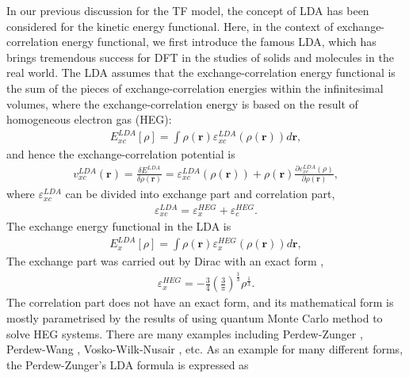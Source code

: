 In our previous discussion for the TF model, the concept of LDA has been considered for the kinetic energy functional. Here, in the context of exchange-correlation energy functional, we first introduce the famous LDA, which has brings tremendous success for DFT in the studies of solids and molecules in the real world. The LDA assumes that the exchange-correlation energy functional is the sum of the pieces of exchange-correlation energies within the infinitesimal volumes, where the exchange-correlation energy is based on the result of homogeneous electron gas (HEG): 
	\begin{equation}
	\begin{aligned}
        E_{xc}^{LDA}[\rho] = \int \rho(\textbf{r}) \varepsilon_{xc}^{LDA}(\rho(\textbf{r})) d\textbf{r},
    \end{aligned}
	\end{equation}
and hence the exchange-correlation potential is
	\begin{equation}
	\begin{aligned}
        v_{xc}^{LDA}(\textbf{r}) = \frac{\delta E^{LDA}}{\delta \rho(\textbf{r})} = \varepsilon_{xc}^{LDA}(\rho(\textbf{r})) + \rho(\textbf{r})\frac{\partial \varepsilon_{xc}^{LDA}(\rho)}{\partial \rho(\textbf{r})},
    \end{aligned}
	\end{equation}
where $\varepsilon_{xc}^{LDA}$ can be divided into exchange part and correlation part,
	\begin{equation}
	\begin{aligned}
        \varepsilon_{xc}^{LDA} = \varepsilon_{x}^{HEG} +\varepsilon_{c}^{HEG}.
    \end{aligned}
	\end{equation}
The exchange energy functional in the LDA is
	\begin{equation}
	\begin{aligned}
        E_{x}^{LDA}[\rho] = \int \rho(\textbf{r}) \varepsilon_{x}^{HEG}(\rho(\textbf{r})) d\textbf{r},
    \end{aligned}
	\end{equation}
The exchange part was carried out by Dirac with an exact form \cite{dirac1930note},
	\begin{equation}
	\begin{aligned}
        \varepsilon_{x}^{HEG} = -\frac{3}{4} \left( \frac{3}{\pi}\right)^{\frac{1}{3}} \rho^{\frac{1}{3}} .
    \end{aligned}
	\end{equation}
The correlation part does not have an exact form, and its mathematical form is mostly parametrised by the results of using quantum Monte Carlo method to solve HEG systems. There are many examples including Perdew-Zunger \cite{perdew1981self}, Perdew-Wang \cite{perdew1992accurate}, Vosko-Wilk-Nusair \cite{vosko1980accurate}, etc. As an example for many different forms, the Perdew-Zunger's LDA formula \cite{perdew1981self} is expressed as

